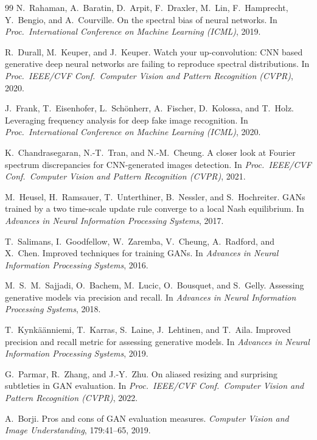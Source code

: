 \documentclass[10pt,twocolumn]{article}
\begin{document}
\begin{thebibliography}{99}
N.~Rahaman, A.~Baratin, D.~Arpit, F.~Draxler, M.~Lin, F.~Hamprecht, Y.~Bengio, and A.~Courville.
On the spectral bias of neural networks.
In \emph{Proc.\ International Conference on Machine Learning (ICML)}, 2019.

R.~Durall, M.~Keuper, and J.~Keuper.
Watch your up-convolution: {CNN} based generative deep neural networks are failing to reproduce spectral distributions.
In \emph{Proc.\ IEEE/CVF Conf.\ Computer Vision and Pattern Recognition (CVPR)}, 2020.

J.~Frank, T.~Eisenhofer, L.~Sch{\"o}nherr, A.~Fischer, D.~Kolossa, and T.~Holz.
Leveraging frequency analysis for deep fake image recognition.
In \emph{Proc.\ International Conference on Machine Learning (ICML)}, 2020.

K.~Chandrasegaran, N.-T.~Tran, and N.-M.~Cheung.
A closer look at {Fourier} spectrum discrepancies for {CNN}-generated images detection.
In \emph{Proc.\ IEEE/CVF Conf.\ Computer Vision and Pattern Recognition (CVPR)}, 2021.

M.~Heusel, H.~Ramsauer, T.~Unterthiner, B.~Nessler, and S.~Hochreiter.
{GAN}s trained by a two time-scale update rule converge to a local {Nash} equilibrium.
In \emph{Advances in Neural Information Processing Systems}, 2017.

T.~Salimans, I.~Goodfellow, W.~Zaremba, V.~Cheung, A.~Radford, and X.~Chen.
Improved techniques for training {GAN}s.
In \emph{Advances in Neural Information Processing Systems}, 2016.

M.~S.~M.~Sajjadi, O.~Bachem, M.~Lucic, O.~Bousquet, and S.~Gelly.
Assessing generative models via precision and recall.
In \emph{Advances in Neural Information Processing Systems}, 2018.

T.~Kynk{\"a}{\"a}nniemi, T.~Karras, S.~Laine, J.~Lehtinen, and T.~Aila.
Improved precision and recall metric for assessing generative models.
In \emph{Advances in Neural Information Processing Systems}, 2019.

G.~Parmar, R.~Zhang, and J.-Y.~Zhu.
On aliased resizing and surprising subtleties in {GAN} evaluation.
In \emph{Proc.\ IEEE/CVF Conf.\ Computer Vision and Pattern Recognition (CVPR)}, 2022.

A.~Borji.
Pros and cons of {GAN} evaluation measures.
\emph{Computer Vision and Image Understanding}, 179:41--65, 2019.


\end{thebibliography}
\end{document}
